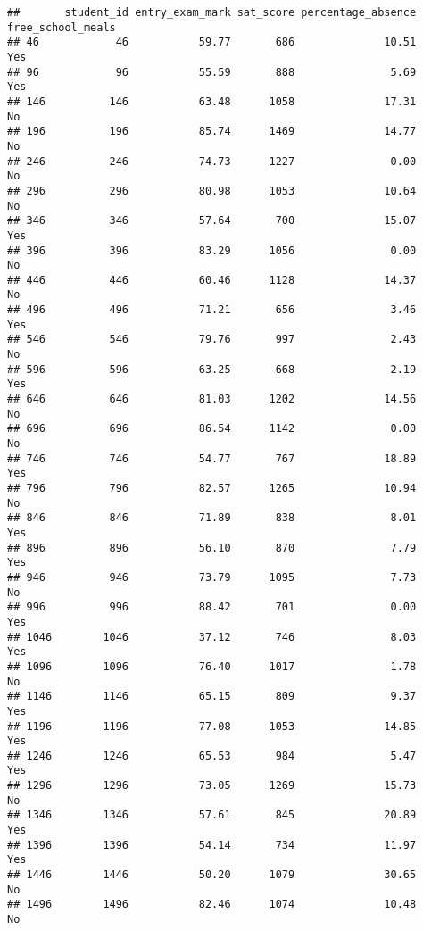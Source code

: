 \documentclass[
]{article}
\begin{document}
\begin{verbatim}
##       student_id entry_exam_mark sat_score percentage_absence free_school_meals
## 46            46           59.77       686              10.51               Yes
## 96            96           55.59       888               5.69               Yes
## 146          146           63.48      1058              17.31                No
## 196          196           85.74      1469              14.77                No
## 246          246           74.73      1227               0.00                No
## 296          296           80.98      1053              10.64                No
## 346          346           57.64       700              15.07               Yes
## 396          396           83.29      1056               0.00                No
## 446          446           60.46      1128              14.37                No
## 496          496           71.21       656               3.46               Yes
## 546          546           79.76       997               2.43                No
## 596          596           63.25       668               2.19               Yes
## 646          646           81.03      1202              14.56                No
## 696          696           86.54      1142               0.00                No
## 746          746           54.77       767              18.89               Yes
## 796          796           82.57      1265              10.94                No
## 846          846           71.89       838               8.01               Yes
## 896          896           56.10       870               7.79               Yes
## 946          946           73.79      1095               7.73                No
## 996          996           88.42       701               0.00               Yes
## 1046        1046           37.12       746               8.03               Yes
## 1096        1096           76.40      1017               1.78                No
## 1146        1146           65.15       809               9.37               Yes
## 1196        1196           77.08      1053              14.85               Yes
## 1246        1246           65.53       984               5.47               Yes
## 1296        1296           73.05      1269              15.73                No
## 1346        1346           57.61       845              20.89               Yes
## 1396        1396           54.14       734              11.97               Yes
## 1446        1446           50.20      1079              30.65                No
## 1496        1496           82.46      1074              10.48                No

\end{verbatim}
\end{document}
